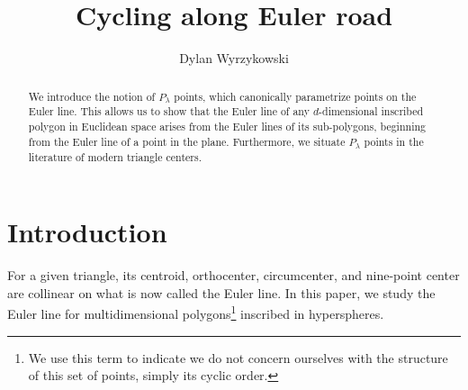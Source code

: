 \documentclass{birkjour}
\theoremstyle{definition}
\theoremstyle{remark}
\numberwithin{equation}{section}
\begin{document}
\title[Cycling along Euler road]
 {Cycling along Euler road}

\author[Dylan Wyrzykowski]{Dylan Wyrzykowski}

\address{
College of Inter-Faculty Individual Studies in Mathematics and Natural Sciences \\
University of Warsaw\\
Stefana Banacha 2C\\
02-097 Warsaw\\
Poland
}




\begin{abstract} We introduce the notion of $P_{\lambda}$ points, which canonically parametrize points on the Euler line. This allows us to show that the Euler line of any $d$-dimensional inscribed polygon in Euclidean space arises from the Euler lines of its sub-polygons, beginning from the Euler line of a point in the plane. Furthermore, we situate $P_{\lambda}$ points in the literature of modern triangle centers.
\end{abstract}

\maketitle

\section{Introduction}

For a given triangle, its centroid, orthocenter, circumcenter, and nine-point center are collinear on what is now called the Euler line. In this paper, we study the Euler line for multidimensional polygons\footnote{We use this term to indicate we do not concern ourselves with the structure of this set of points, simply its cyclic order. } inscribed in hyperspheres.
\end{document}
